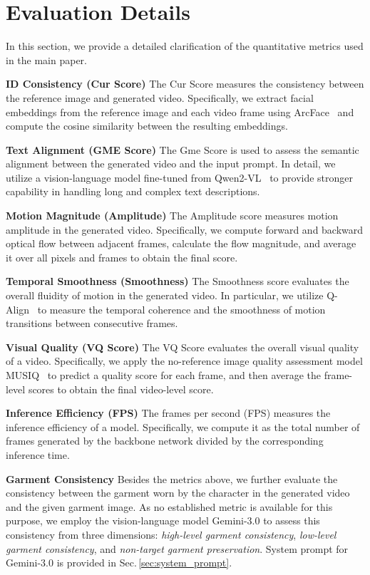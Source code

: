 \section{Evaluation Details}
% 
In this section, we provide a detailed clarification of the quantitative metrics used in the main paper.


\noindent
\textbf{ID Consistency (Cur Score)}
% 
The Cur Score measures the consistency between the reference image and generated video.
Specifically, we extract facial embeddings from the reference image and each video frame using ArcFace~\cite{deng2019arcface} and compute the cosine similarity between the resulting embeddings.


\noindent
\textbf{Text Alignment (GME Score)}
% 
The Gme Score is used to assess the semantic alignment between the generated video and the input prompt.
In detail, we utilize a vision-language model fine-tuned from Qwen2-VL~\cite{wang2024qwen2} to provide stronger capability in handling long and complex text descriptions.


\noindent
\textbf{Motion Magnitude (Amplitude)}
% 
The Amplitude score measures motion amplitude in the generated video.
Specifically, we compute forward and backward optical flow between adjacent frames, calculate the flow magnitude, and average it over all pixels and frames to obtain the final score.


\noindent
\textbf{Temporal Smoothness (Smoothness)}
% 
The Smoothness score evaluates the overall fluidity of motion in the generated video.
In particular, we utilize Q-Align~\cite{wu2023q} to measure the temporal coherence and the smoothness of motion transitions between consecutive frames.


\noindent
\textbf{Visual Quality (VQ Score)}
% 
The VQ Score evaluates the overall visual quality of a video.
Specifically, we apply the no-reference image quality assessment model MUSIQ~\cite{ke2021musiq} to predict a quality score for each frame, and then average the frame-level scores to obtain the final video-level score.


\noindent
\textbf{Inference Efficiency (FPS)}
% 
The frames per second (FPS) measures the inference efficiency of a model.
Specifically, we compute it as the total number of frames generated by the backbone network divided by the corresponding inference time.


\noindent
\textbf{Garment Consistency}
Besides the metrics above, we further evaluate the consistency between the garment worn by the character in the generated video and the given garment image.
As no established metric is available for this purpose, we employ the vision-language model Gemini-3.0 to assess this consistency from three dimensions: \textit{high-level garment consistency}, \textit{low-level garment consistency}, and \textit{non-target garment preservation}.
% 
System prompt for Gemini-3.0 is provided in Sec.\,\ref{sec:system_prompt}.





